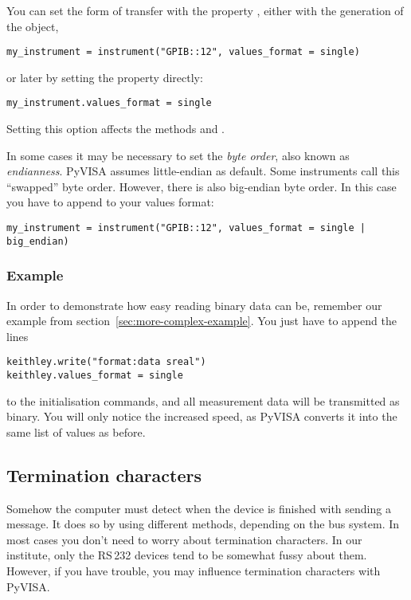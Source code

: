 \documentclass{howto}
\begin{document}
You can set the form of transfer with the property , either
with the generation of the object,
\begin{verbatim}
my_instrument = instrument("GPIB::12", values_format = single)
\end{verbatim}
or later by setting the property directly:
\begin{verbatim}
my_instrument.values_format = single
\end{verbatim}
Setting this option affects the methods  and
.

In some cases it may be necessary to set the \emph{byte order}, also known as
\emph{endianness}.  PyVISA assumes little-endian as default.  Some instruments
call this ``swapped'' byte order.  However, there is also big-endian byte
order.  In this case you have to append  to your values
format:
\begin{verbatim}
my_instrument = instrument("GPIB::12", values_format = single | big_endian)
\end{verbatim}


\subsubsection{Example}
\label{sec:binary-example}

In order to demonstrate how easy reading binary data can be, remember our
example from section~\ref{sec:more-complex-example}.  You just have to append
the lines
\begin{verbatim}
keithley.write("format:data sreal")
keithley.values_format = single
\end{verbatim}
to the initialisation commands, and all measurement data will be transmitted as
binary.  You will only notice the increased speed, as PyVISA converts it into
the same list of values as before.


\subsection{Termination characters}
\label{sec:termchars}

Somehow the computer must detect when the device is finished with sending a
message.  It does so by using different methods, depending on the bus system.
In most cases you don't need to worry about termination characters.  In our
institute, only the RS\,232 devices tend to be somewhat fussy about them.
However, if you have trouble, you may influence termination characters with
PyVISA\@.
\end{document}
